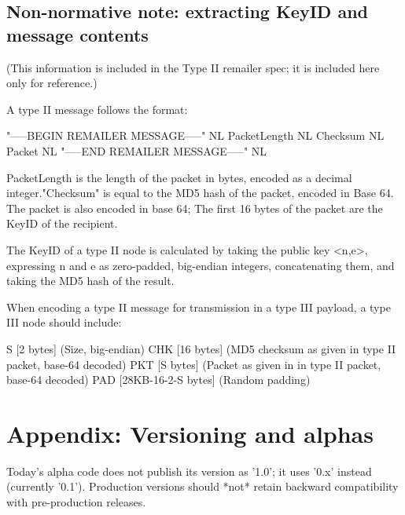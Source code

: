 \subsection{Non-normative note: extracting KeyID and message contents}

(This information is included in the Type II remailer spec; it is included
here only for reference.)

A type II message follows the format:

"-----BEGIN REMAILER MESSAGE-----" NL
PacketLength NL
Checksum NL
Packet NL
"-----END REMAILER MESSAGE-----" NL

PacketLength is the length of the packet in bytes, encoded as a
decimal integer."Checksum" is equal to the MD5 hash of the packet,
encoded in Base 64.  The packet is also encoded in base 64; The first
16 bytes of the packet are the KeyID of the recipient.

The KeyID of a type II node is calculated by taking the public key
<n,e>, expressing n and e as zero-padded, big-endian integers,
concatenating them, and taking the MD5 hash of the result.

When encoding a type II message for transmission in a type III payload,
a type III node should include:

S   [2 bytes] (Size, big-endian)
CHK [16 bytes] (MD5 checksum as given in type II packet, base-64 decoded)
PKT [S bytes] (Packet as given in in type II packet, base-64 decoded)
PAD [28KB-16-2-S bytes] (Random padding)

\section{Appendix: Versioning and alphas}

Today's alpha code does not publish its version as '1.0'; it uses
'0.x' instead (currently '0.1').  Production versions should *not*
retain backward compatibility with pre-production releases.
